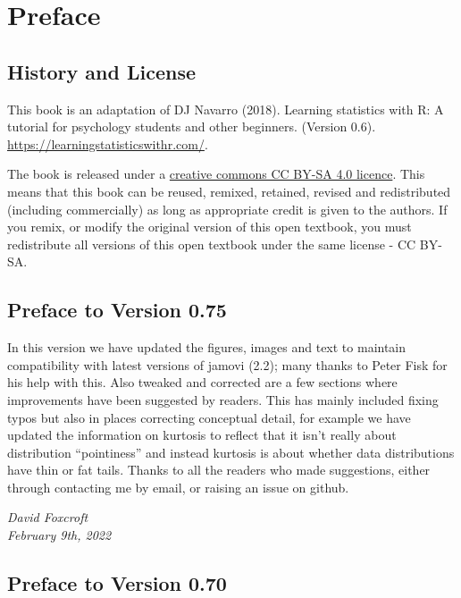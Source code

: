 \documentclass[
  letterpaper,
]{book}
\begin{document}
\hypertarget{preface}{%
\chapter*{Preface}\label{preface}}

\hypertarget{history-and-license}{%
\section*{History and License}\label{history-and-license}}

This book is an adaptation of DJ Navarro (2018). Learning statistics
with R: A tutorial for psychology students and other beginners. (Version
0.6). \url{https://learningstatisticswithr.com/}.

The book is released under a
\href{https://creativecommons.org/licenses/by-sa/4.0/}{creative commons
CC BY-SA 4.0 licence}. This means that this book can be reused, remixed,
retained, revised and redistributed (including commercially) as long as
appropriate credit is given to the authors. If you remix, or modify the
original version of this open textbook, you must redistribute all
versions of this open textbook under the same license - CC BY-SA.

\hypertarget{preface-to-version-0.75}{%
\section*{Preface to Version 0.75}\label{preface-to-version-0.75}}

In this version we have updated the figures, images and text to maintain
compatibility with latest versions of jamovi (2.2); many thanks to Peter
Fisk for his help with this. Also tweaked and corrected are a few
sections where improvements have been suggested by readers. This has
mainly included fixing typos but also in places correcting conceptual
detail, for example we have updated the information on kurtosis to
reflect that it isn't really about distribution ``pointiness'' and
instead kurtosis is about whether data distributions have thin or fat
tails. Thanks to all the readers who made suggestions, either through
contacting me by email, or raising an issue on github.

\emph{David Foxcroft\\
February 9th, 2022}

\hypertarget{preface-to-version-0.70}{%
\section*{Preface to Version 0.70}\label{preface-to-version-0.70}}
\end{document}
